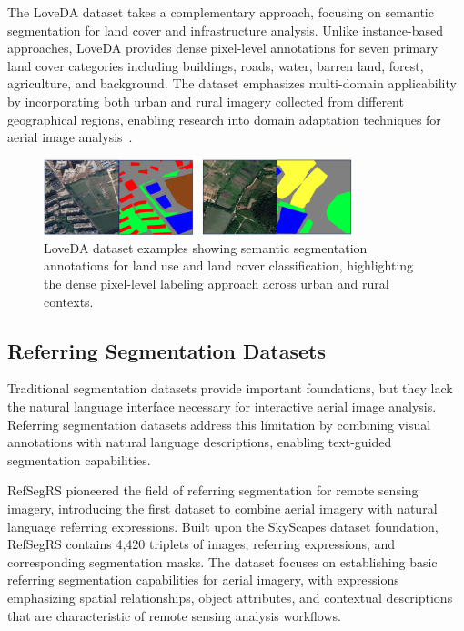 The LoveDA dataset takes a complementary approach, focusing on semantic segmentation for land cover and infrastructure analysis. Unlike instance-based approaches, LoveDA provides dense pixel-level annotations for seven primary land cover categories including buildings, roads, water, barren land, forest, agriculture, and background. The dataset emphasizes multi-domain applicability by incorporating both urban and rural imagery collected from different geographical regions, enabling research into domain adaptation techniques for aerial image analysis~\cite{wang2021loveda}.

\begin{figure}[htbp]
\centering
\includegraphics[width=0.8\textwidth]{Images/loveda.png}
\caption{LoveDA dataset examples showing semantic segmentation annotations for land use and land cover classification, highlighting the dense pixel-level labeling approach across urban and rural contexts.}
\label{fig:loveda_examples}
\end{figure}

\subsection{Referring Segmentation Datasets}

Traditional segmentation datasets provide important foundations, but they lack the natural language interface necessary for interactive aerial image analysis. Referring segmentation datasets address this limitation by combining visual annotations with natural language descriptions, enabling text-guided segmentation capabilities.

RefSegRS pioneered the field of referring segmentation for remote sensing imagery, introducing the first dataset to combine aerial imagery with natural language referring expressions. Built upon the SkyScapes dataset foundation, RefSegRS contains 4,420 triplets of images, referring expressions, and corresponding segmentation masks. The dataset focuses on establishing basic referring segmentation capabilities for aerial imagery, with expressions emphasizing spatial relationships, object attributes, and contextual descriptions that are characteristic of remote sensing analysis workflows.

